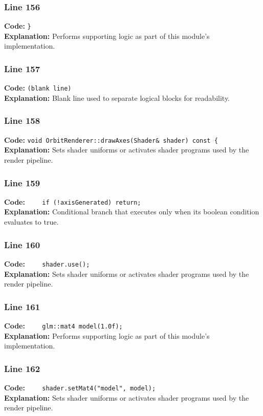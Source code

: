 \documentclass[11pt,a4paper]{article}
\begin{document}
\subsubsection*{Line 156}
\textbf{Code:} \verb|}|\\
\textbf{Explanation:} Performs supporting logic as part of this module's implementation.

\subsubsection*{Line 157}
\textbf{Code:} \texttt{(blank line)}\\
\textbf{Explanation:} Blank line used to separate logical blocks for readability.

\subsubsection*{Line 158}
\textbf{Code:} \verb|void OrbitRenderer::drawAxes(Shader& shader) const {|\\
\textbf{Explanation:} Sets shader uniforms or activates shader programs used by the render pipeline.

\subsubsection*{Line 159}
\textbf{Code:} \verb|    if (!axisGenerated) return;|\\
\textbf{Explanation:} Conditional branch that executes only when its boolean condition evaluates to true.

\subsubsection*{Line 160}
\textbf{Code:} \verb|    shader.use();|\\
\textbf{Explanation:} Sets shader uniforms or activates shader programs used by the render pipeline.

\subsubsection*{Line 161}
\textbf{Code:} \verb|    glm::mat4 model(1.0f);|\\
\textbf{Explanation:} Performs supporting logic as part of this module's implementation.

\subsubsection*{Line 162}
\textbf{Code:} \verb|    shader.setMat4("model", model);|\\
\textbf{Explanation:} Sets shader uniforms or activates shader programs used by the render pipeline.
\end{document}
